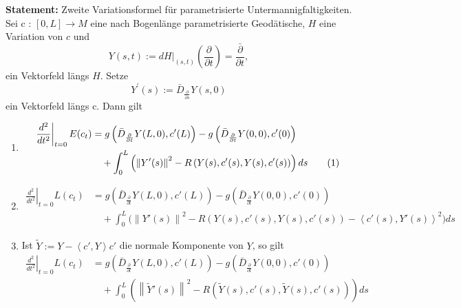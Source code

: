 \documentclass[10pt, letterpaper]{article}
\begin{document}
\textbf{Statement: }{Zweite Variationsformel für parametrisierte Untermannigfaltigkeiten}.
Sei c : $[0, L] \rightarrow M$ eine nach Bogenlänge parametrisierte Geodätische, $H$ eine Variation von $c$ und
$$
Y(s, t):=\left.d H\right|_{(s, t)}\left(\frac{\partial}{\partial t}\right)=\frac{\bar{\partial}}{\partial t},
$$
ein Vektorfeld längs $H$. Setze
$$
Y^{\prime}(s):=\bar{D}_{\frac{\partial}{\partial s}} Y(s, 0)
$$
ein Vektorfeld längs c. Dann gilt
\begin{enumerate}
  \item
  \begin{align}
  \left.\frac{d^{2}}{d t^{2}}\right|_{t=0} E(c_t)
  &= g\left(\bar{D}_{\frac{\partial}{\partial t}} Y(L, 0), c'(L)\right)
  - g\left(\bar{D}_{\frac{\partial}{\partial t}} Y(0, 0), c'(0)\right) \notag \\
  &\quad + \int_0^L \left( \left\| Y'(s) \right\|^2
  - R\left(Y(s), c'(s), Y(s), c'(s)\right) \right) ds \tag{1}
  \end{align}

  \item
  \begin{align*}
  \left.\frac{d^{2}}{d t^{2}}\right|_{t=0} L(c_t)
  &= g\left(\bar{D}_{\frac{\partial}{\partial t}} Y(L, 0), c'(L)\right)
  - g\left(\bar{D}_{\frac{\partial}{\partial t}} Y(0, 0), c'(0)\right) \\
  &\quad + \int_0^L \Big( \left\| Y'(s) \right\|^2
  - R\left(Y(s), c'(s), Y(s), c'(s)\right)
  - \left\langle c'(s), Y'(s) \right\rangle^2 \Big) ds
  \end{align*}

  \item Ist $\tilde{Y} := Y - \left\langle c', Y \right\rangle c'$ die normale Komponente von $Y$, so gilt
  \begin{align*}
  \left.\frac{d^{2}}{d t^{2}}\right|_{t=0} L(c_t)
  &= g\left(\bar{D}_{\frac{\partial}{\partial t}} Y(L, 0), c'(L)\right)
  - g\left(\bar{D}_{\frac{\partial}{\partial t}} Y(0, 0), c'(0)\right) \\
  &\quad + \int_0^L \left( \left\| \tilde{Y}'(s) \right\|^2
  - R\left(\tilde{Y}(s), c'(s), \tilde{Y}(s), c'(s)\right) \right) ds
  \end{align*}
\end{enumerate}
\end{document}
